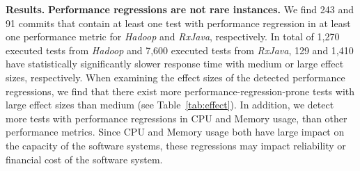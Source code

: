  \textbf{Results.}
\textbf{Performance regressions are not rare instances.} We find 243 and 91 commits that contain at least one test with performance regression in at least one performance metric for \emph{Hadoop} and \emph{RxJava}, respectively. In total of 1,270 executed tests from \emph{Hadoop} and 7,600 executed tests from \emph{RxJava}, 129 and 1,410 have statistically significantly slower response time with medium or large effect sizes, respectively. When examining the effect sizes of the detected performance regressions, we find that there exist more performance-regression-prone tests with large effect sizes than medium (see Table~\ref{tab:effect}). In addition, we detect more tests with performance regressions in CPU and Memory usage, than other performance metrics. Since CPU and Memory usage both have large impact on the capacity of the software systems, these regressions may impact reliability or financial cost of the software system. 
